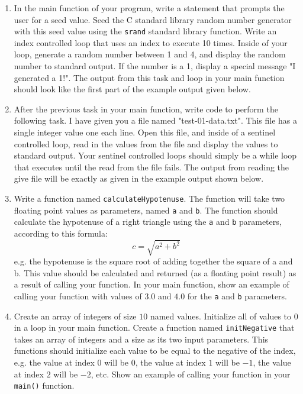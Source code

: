 \documentclass[11pt]{article}
\begin{document}
\begin{enumerate}
\item In the main function of your program, write a statement that
prompts the user for a seed value.  Seed the C standard library
random number generator with this seed value using the \verb~srand~
standard library function.  Write an index controlled loop that
uses an index to execute 10 times.  Inside of your loop, generate a
random number between 1 and 4, and display the random number to
standard output.  If the number is a 1, display a special message
"I generated a 1!".  The output from this task and loop in your
main function should look like the first part of the example
output given below.

\item After the previous task in your main function, write code to
perform the following task.  I have given you a file named
"test-01-data.txt".  This file has a single integer value
one each line.  Open this file, and inside of a sentinel 
controlled loop, read in the values from the file and
display the values to standard output.  Your sentinel
controlled loops should simply be a while loop that executes
until the read from the file fails.  The output from
reading the give file will be exactly as given in 
the example output shown below.

\item Write a function named \verb~calculateHypotenuse~.  The function 
 will take two floating point values as parameters, named \verb~a~
 and \verb~b~.  The function should calculate the hypotenuse of 
 a right triangle using the \verb~a~ and \verb~b~ parameters, according
 to this formula:
$$
  c = \sqrt{a^2 + b^2}
  $$
e.g. the hypotenuse is the square root of adding together the
square of a and b.  This value should be calculated and returned
(as a floating point result) as a result of calling your function.
In your main function, show an example of calling your function with
values of $3.0$ and $4.0$ for the \verb~a~ and \verb~b~ parameters.

\item Create an array of integers of size $10$ named values.  Initialize
all of values to $0$ in a loop in your main function.  Create a
function named \verb~initNegative~ that takes an array of integers
and a size as its two input parameters.  This functions
should initialize each value to be equal to the negative
of the index, e.g. the value at index $0$ will be $0$, the
value at index $1$ will be $-1$, the value at index $2$ will be
$-2$, etc.  Show an example of calling your function in your
\verb~main()~ function.
\end{enumerate}
\end{document}

